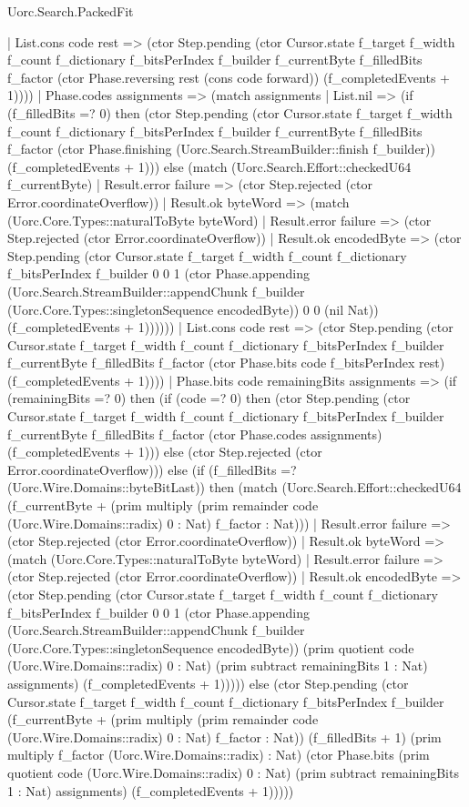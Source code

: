 \begin{lexlean}{Uorc.Search.PackedFit}
\begin{semanticmodule}
{        | List.cons code rest => (ctor Step.pending (ctor Cursor.state f_target f_width f_count f_dictionary f_bitsPerIndex f_builder f_currentByte f_filledBits f_factor (ctor Phase.reversing rest (cons code forward)) (f_completedEvents + 1))))
      | Phase.codes assignments => (match assignments
        | List.nil => (if (f_filledBits =? 0) then (ctor Step.pending (ctor Cursor.state f_target f_width f_count f_dictionary f_bitsPerIndex f_builder f_currentByte f_filledBits f_factor (ctor Phase.finishing (Uorc.Search.StreamBuilder::finish f_builder)) (f_completedEvents + 1))) else (match (Uorc.Search.Effort::checkedU64 f_currentByte)
          | Result.error failure => (ctor Step.rejected (ctor Error.coordinateOverflow))
          | Result.ok byteWord => (match (Uorc.Core.Types::naturalToByte byteWord)
            | Result.error failure => (ctor Step.rejected (ctor Error.coordinateOverflow))
            | Result.ok encodedByte => (ctor Step.pending (ctor Cursor.state f_target f_width f_count f_dictionary f_bitsPerIndex f_builder 0 0 1 (ctor Phase.appending (Uorc.Search.StreamBuilder::appendChunk f_builder (Uorc.Core.Types::singletonSequence encodedByte)) 0 0 (nil Nat)) (f_completedEvents + 1))))))
        | List.cons code rest => (ctor Step.pending (ctor Cursor.state f_target f_width f_count f_dictionary f_bitsPerIndex f_builder f_currentByte f_filledBits f_factor (ctor Phase.bits code f_bitsPerIndex rest) (f_completedEvents + 1))))
      | Phase.bits code remainingBits assignments => (if (remainingBits =? 0) then (if (code =? 0) then (ctor Step.pending (ctor Cursor.state f_target f_width f_count f_dictionary f_bitsPerIndex f_builder f_currentByte f_filledBits f_factor (ctor Phase.codes assignments) (f_completedEvents + 1))) else (ctor Step.rejected (ctor Error.coordinateOverflow))) else (if (f_filledBits =? (Uorc.Wire.Domains::byteBitLast)) then (match (Uorc.Search.Effort::checkedU64 (f_currentByte + (prim multiply (prim remainder code (Uorc.Wire.Domains::radix) 0 : Nat) f_factor : Nat)))
        | Result.error failure => (ctor Step.rejected (ctor Error.coordinateOverflow))
        | Result.ok byteWord => (match (Uorc.Core.Types::naturalToByte byteWord)
          | Result.error failure => (ctor Step.rejected (ctor Error.coordinateOverflow))
          | Result.ok encodedByte => (ctor Step.pending (ctor Cursor.state f_target f_width f_count f_dictionary f_bitsPerIndex f_builder 0 0 1 (ctor Phase.appending (Uorc.Search.StreamBuilder::appendChunk f_builder (Uorc.Core.Types::singletonSequence encodedByte)) (prim quotient code (Uorc.Wire.Domains::radix) 0 : Nat) (prim subtract remainingBits 1 : Nat) assignments) (f_completedEvents + 1))))) else (ctor Step.pending (ctor Cursor.state f_target f_width f_count f_dictionary f_bitsPerIndex f_builder (f_currentByte + (prim multiply (prim remainder code (Uorc.Wire.Domains::radix) 0 : Nat) f_factor : Nat)) (f_filledBits + 1) (prim multiply f_factor (Uorc.Wire.Domains::radix) : Nat) (ctor Phase.bits (prim quotient code (Uorc.Wire.Domains::radix) 0 : Nat) (prim subtract remainingBits 1 : Nat) assignments) (f_completedEvents + 1)))))
}
\end{semanticmodule}
\end{lexlean}
